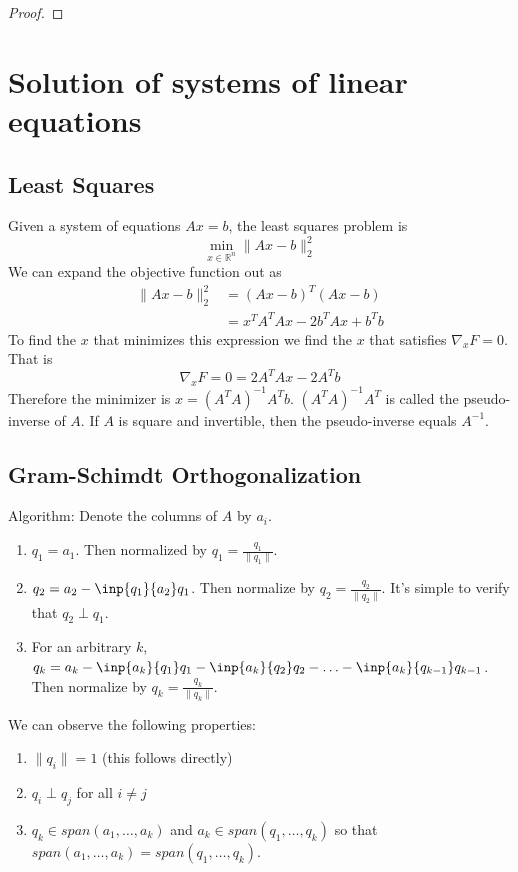 \documentclass[12pt]{article}
\theoremstyle{definition}
\newcommand{\R}{\mathbb{R}}
\newcommand{\norm}[1]{\lVert#1\rVert}
\begin{document}
\begin{proof}

\end{proof}

\section{Solution of systems of linear equations}

\subsection{Least Squares}
Given a system of equations $Ax = b$, the least squares problem is
\begin{equation}
	\min_{x \in \R^n} \norm{Ax - b}^2_2 
\end{equation}
We can expand the objective function out as
\begin{align*}
	\norm{Ax - b}^2_2 &= (Ax - b)^T (Ax - b) \\
	&= x^T A^T A x - 2 b^T A x + b^T b 
\end{align*}
To find the $x$ that minimizes this expression we find the $x$ that satisfies $\nabla_x F = 0$. That is
\begin{equation}
	\nabla_x F = 0 = 2 A^T A x - 2 A^T b
\end{equation}
Therefore the minimizer is $x = (A^T A)^{-1} A^T b$. $(A^T A)^{-1} A^T$ is called the pseudo-inverse of $A$. If $A$ is square and invertible, then the pseudo-inverse equals $A^{-1}$.

\subsection{Gram-Schimdt Orthogonalization}
Algorithm: Denote the columns of $A$ by $a_i$. 
\begin{enumerate}
	\item $q_1 = a_1$. Then normalized by $q_1 = \frac{q_1}{\norm{q_1}}$.
	\item $q_2 = a_2 - \inp{q_1}{a_2}q_1$. Then normalize by $q_2 = \frac{q_2}{\norm{q_2}}$. It's simple to verify that $q_2 \perp q_1$. 
	\item For an arbitrary $k$, $q_k = a_k - \inp{a_k}{q_1}q_1 - \inp{a_k}{q_2}q_2 - \ldots - \inp{a_k}{q_{k-1}}q_{k-1}$. Then normalize by $q_k = \frac{q_k}{\norm{q_k}}$.
\end{enumerate}

We can observe the following properties:
\begin{enumerate}
	\item $\norm{q_i} = 1$ (this follows directly)
	\item $q_i \perp q_j$ for all $i \neq j$
	\item $q_k \in span(a_1, \ldots, a_k)$ and $a_k \in span(q_1, \ldots, q_k)$ so that $span(a_1, \ldots, a_k) = span(q_1, \ldots, q_k)$.
\end{enumerate}
\end{document}
